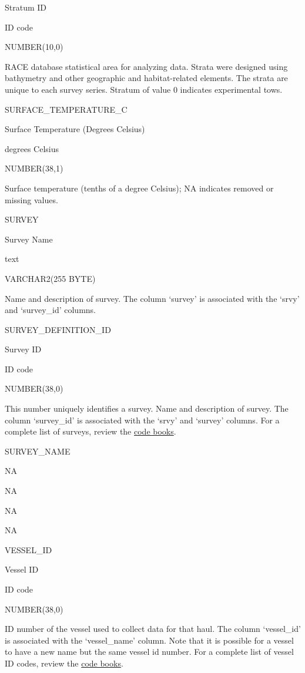 \documentclass[
  letterpaper,
  oneside,
  open=any]{scrbook}
\begin{document}
Stratum ID

ID code

NUMBER(10,0)

RACE database statistical area for analyzing data. Strata were designed
using bathymetry and other geographic and habitat-related elements. The
strata are unique to each survey series. Stratum of value 0 indicates
experimental tows.

SURFACE\_TEMPERATURE\_C

Surface Temperature (Degrees Celsius)

degrees Celsius

NUMBER(38,1)

Surface temperature (tenths of a degree Celsius); NA indicates removed
or missing values.

SURVEY

Survey Name

text

VARCHAR2(255 BYTE)

Name and description of survey. The column `survey' is associated with
the `srvy' and `survey\_id' columns.

SURVEY\_DEFINITION\_ID

Survey ID

ID code

NUMBER(38,0)

This number uniquely identifies a survey. Name and description of
survey. The column `survey\_id' is associated with the `srvy' and
`survey' columns. For a complete list of surveys, review the
\href{https://www.fisheries.noaa.gov/resource/document/groundfish-survey-species-code-manual-and-data-codes-manual}{code
books}.

SURVEY\_NAME

NA

NA

NA

NA

VESSEL\_ID

Vessel ID

ID code

NUMBER(38,0)

ID number of the vessel used to collect data for that haul. The column
`vessel\_id' is associated with the `vessel\_name' column. Note that it
is possible for a vessel to have a new name but the same vessel id
number. For a complete list of vessel ID codes, review the
\href{https://www.fisheries.noaa.gov/resource/document/groundfish-survey-species-code-manual-and-data-codes-manual}{code
books}.
\end{document}
